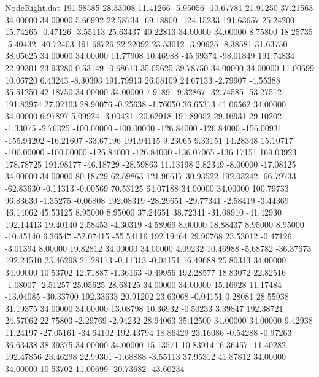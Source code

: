 \begin{filecontents}{NodeRight.dat}
 191.58585   28.33008   11.41266    -5.95056  -10.67781   21.91250   37.21563   34.00000   34.00000    5.66992   22.58734  -69.18800 -124.15233
 191.63657   25.24200   15.74265    -0.47126   -3.55113   25.63437   40.22813   34.00000   34.00000    8.75800   18.25735   -5.40432  -40.72403
 191.68726   22.22092   23.53012    -3.90925   -8.38581   31.63750   38.05625   34.00000   34.00000   11.77908   10.46988  -45.69374  -98.01849
 191.74834   22.99301   23.93280     0.53149   -0.68613   35.05625   39.78750   34.00000   34.00000   11.00699   10.06720    6.43243   -8.30393
 191.79913   26.08109   24.67133    -2.79907   -4.55388   35.51250   42.18750   34.00000   34.00000    7.91891    9.32867  -32.74585  -53.27512
 191.83974   27.02103   28.90076    -0.25638   -1.76050   36.65313   41.06562   34.00000   34.00000    6.97897    5.09924   -3.00421  -20.62918
 191.89052   29.16931   29.10202    -1.33075   -2.76325 -100.00000 -100.00000 -126.84000 -126.84000 -156.00931 -155.94202  -16.21607  -33.67196
 191.94115    9.23065    9.33151    14.28348   15.10717 -100.00000 -100.00000 -126.84000 -126.84000 -136.07065 -136.17151  169.03923  178.78725
 191.98177  -46.18729  -28.59863    11.13198    2.82349   -8.00000  -17.08125   34.00000   34.00000   80.18729   62.59863  121.96617   30.93522
 192.03242  -66.79733  -62.83630    -0.11313   -0.00569   70.53125   64.07188   34.00000   34.00000  100.79733   96.83630   -1.35275   -0.06808
 192.08319  -28.29651  -29.77341    -2.58419   -3.44369   46.14062   45.53125    8.95000    8.95000   37.24651   38.72341  -31.08910  -41.42930
 192.14413   19.40140    2.58453    -4.30319   -4.58969    8.00000   18.88437    8.95000    8.95000  -10.45140    6.36547  -52.07415  -55.54116
 192.19464   29.90768   23.53012    -0.47126   -3.01394    8.00000   19.82812   34.00000   34.00000    4.09232   10.46988   -5.68782  -36.37673
 192.24510   23.46298   21.28113    -0.11313   -0.04151   16.49688   25.80313   34.00000   34.00000   10.53702   12.71887   -1.36163   -0.49956
 192.28577   18.83072   22.82516    -1.08007   -2.51257   25.05625   28.68125   34.00000   34.00000   15.16928   11.17484  -13.04085  -30.33700
 192.33633   20.91202   23.63068    -0.04151    0.28081   28.55938   31.19375   34.00000   34.00000   13.08798   10.36932   -0.50233    3.39847
 192.38721   24.57062   22.75803    -2.29769   -2.94232   28.94063   35.12500   34.00000   34.00000    9.42938   11.24197  -27.05161  -34.64102
 192.43794   18.86429   23.16086    -0.54288   -0.97263   36.63438   38.39375   34.00000   34.00000   15.13571   10.83914   -6.36457  -11.40282
 192.47856   23.46298   22.99301    -1.68888   -3.55113   37.95312   41.87812   34.00000   34.00000   10.53702   11.00699  -20.73682  -43.60234

\end{filecontents}
